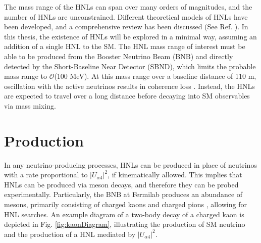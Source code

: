 The mass range of the HNLs can span over many orders of magnitudes, and the number of HNLs are unconstrained.
Different theoretical models of HNLs have been developed, and a comprehensive review has been discussed (See Ref. \cite{HNLWhitePaper}). 
In this thesis, the existence of HNLs will be explored in a minimal way, assuming an addition of a single HNL to the SM.  
The HNL mass range of interest must be able to be produced from the Booster Neutrino Beam (BNB) and directly detected by the Short-Baseline Near Detector (SBND), which limits the probable mass range to $\mathcal{O}$(100 MeV).
At this mass range over a baseline distance of 110 m, oscillation with the active neutrinos results in coherence loss \cite{SBNHNL}.
Instead, the HNLs are expected to travel over a long distance before decaying into SM observables via mass mixing.

 
\section{Production}
\label{sec2Production}
In any neutrino-producing processes, HNLs can be produced in place of neutrinos with a rate proportional to $|U_{\alpha4}|^{2}$, if kinematically allowed. 
This implies that HNLs can be produced via meson decays, and therefore they can be probed experimentally.
Particularly, the BNB at Fermilab produces an abundance of mesons, primarily consisting of charged kaons and charged pions \cite{BNBFlux}, allowing for HNL searches.
An example diagram of a two-body decay of a charged kaon is depicted in Fig. \ref{fig:kaonDiagram}, illustrating the production of SM neutrino and the production of a HNL mediated by $|U_{\alpha4}|^{2}$.

